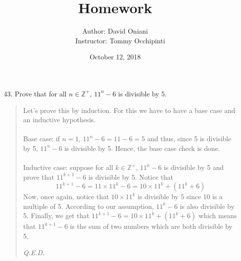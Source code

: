 \documentclass[12pt, a4paper]{article}                      %
\title{\bf{Homework \textnumero 6}}
\author{Author: David Oniani
\\
\ \ \ Instructor: Tommy Occhipinti}
\date{October 12, 2018}
\newcommand{\intzp}{\mathbb{Z^+}}
\begin{document}
\maketitle


\begin{itemize}
\item[43.]
Prove that for all $n \in \intzp$, $11^n - 6$ is divisible by 5.
\begin{quote}
Let's prove this by induction. For this we have to have a base case
and an inductive hypothesis.\\\\
Base case: if $n = 1$, $11^n - 6 = 11 - 6 = 5$ and thus, since 5 is divisible by 5, $11^n - 6$ is divisible by 5. Hence, the base case check is done.\\\\
Inductive case: suppose for all $k \in \intzp$, $11^k - 6$ is divisible by 5 and prove that $11^{k + 1} - 6$ is divisible by 5.
Notice that
$$11^{k + 1} - 6 = 11 \times 11^k - 6 = 10 \times 11^k + (11^k + 6)$$
Now, once again, notice that $10 \times 11^k$ is divisible by 5 since 10 is a multiple of 5. According to our assumption,
$11^k - 6$ is also divisible by 5.
Finally, we get that $11^{k + 1} - 6 = 10\times 11^k + (11^k + 6)$ which means that $11^{k + 1} - 6$ is the sum of two numbers which
are both divisible by 5.
\begin{flushright}
\textit{Q.E.D.}
\end{flushright}
\end{quote}

\item[]
\item[]


\end{itemize}
\end{document}
